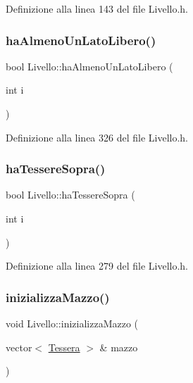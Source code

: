 Definizione alla linea 143 del file Livello.\+h.

\mbox{\label{class_livello_aa7fccdc395e08eb3c1b833347c296bbe}} 
\subsubsection{\texorpdfstring{ha\+Almeno\+Un\+Lato\+Libero()}{haAlmenoUnLatoLibero()}}
{\footnotesize\ttfamily bool Livello\+::ha\+Almeno\+Un\+Lato\+Libero (\begin{DoxyParamCaption}\item[{int}]{i }\end{DoxyParamCaption})\hspace{0.3cm}{\ttfamily [inline]}}



Definizione alla linea 326 del file Livello.\+h.

\mbox{\label{class_livello_a330c46c81139158c4a90f491b7d15151}} 
\subsubsection{\texorpdfstring{ha\+Tessere\+Sopra()}{haTessereSopra()}}
{\footnotesize\ttfamily bool Livello\+::ha\+Tessere\+Sopra (\begin{DoxyParamCaption}\item[{int}]{i }\end{DoxyParamCaption})\hspace{0.3cm}{\ttfamily [inline]}}



Definizione alla linea 279 del file Livello.\+h.

\mbox{\label{class_livello_aff2cb62068d75305993ecf99d5d0d2d5}} 
\subsubsection{\texorpdfstring{inizializza\+Mazzo()}{inizializzaMazzo()}}
{\footnotesize\ttfamily void Livello\+::inizializza\+Mazzo (\begin{DoxyParamCaption}\item[{vector$<$ \hyperlink{class_tessera}{Tessera} $>$ \&}]{mazzo }\end{DoxyParamCaption})\hspace{0.3cm}{\ttfamily [inline]}}



